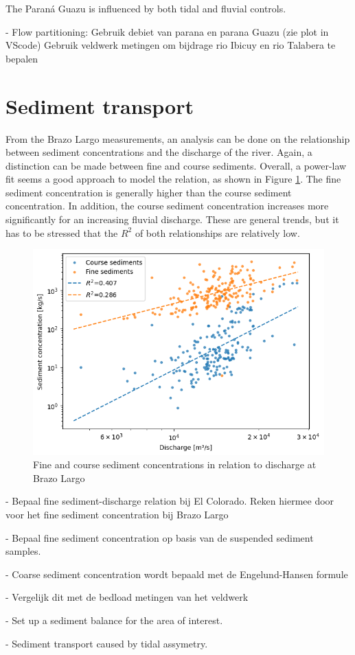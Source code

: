 


The Paraná Guazu is influenced by both tidal and fluvial controls.
    

- Flow partitioning:
    Gebruik debiet van parana en parana Guazu (zie plot in VScode)
    Gebruik veldwerk metingen om bijdrage rio Ibicuy en rio Talabera te bepalen


\section{Sediment transport}
From the Brazo Largo measurements, an analysis can be done on the relationship between sediment concentrations and the discharge of the river. Again, a distinction can be made between fine and course sediments. Overall, a power-law fit seems a good approach to model the relation, as shown in Figure \ref{fig:sediments discharge}. The fine sediment concentration is generally higher than the course sediment concentration. In addition, the course sediment concentration increases more significantly for an increasing fluvial discharge. These are general trends, but it has to be stressed that the $R^2$ of both relationships are relatively low. 

\begin{figure}
    \centering
    \includegraphics[width=0.5\linewidth]{figures/ch5/Discharge sediment relation.png}
    \caption{Fine and course sediment concentrations in relation to discharge at Brazo Largo}
    \label{fig:sediments discharge}
\end{figure}



- Bepaal fine sediment-discharge relation bij El Colorado. Reken hiermee door voor het fine sediment concentration bij Brazo Largo

- Bepaal fine sediment concentration op basis van de suspended sediment samples.

- Coarse sediment concentration wordt bepaald met de Engelund-Hansen formule

- Vergelijk dit met de bedload metingen van het veldwerk

- Set up a sediment balance for the area of interest.


- Sediment transport caused by tidal assymetry.

